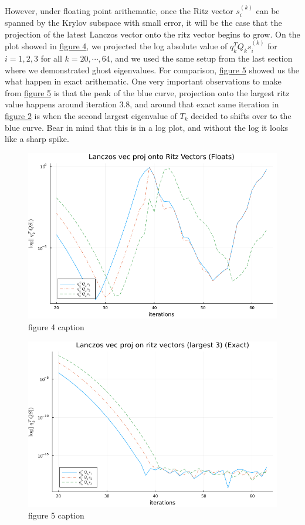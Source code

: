 \documentclass[]{article}
\theoremstyle{definition}
\begin{document}
            However, under floating point arithematic, once the Ritz vector $s_i^{(k)}$ can be spanned by the Krylov subspace with small error, it will be the case that the projection of the latest Lanczos vector onto the ritz vector begins to grow. On the plot showed in \hyperref[fig:4]{figure 4}, we projected the log absolute value of $q_k^TQ_ks_i^{(k)}$ for $i=1, 2, 3$ for all $k=20, \cdots, 64$, and we used the same setup from the last section where we demonstrated ghost eigenvalues. For comparison, \hyperref[fig:5]{figure 5} showed us the what happen in exact arithematic. One very important observations to make from \hyperref[fig:5]{figure 5} is that the peak of the blue curve, projection onto the largest ritz value happens around iteration 3.8, and around that exact same iteration in \hyperref[fig:2]{figure 2} is when the second largest eigenvalue of $T_k$ decided to shifts over to the blue curve. Bear in mind that this is in a log plot, and without the log it looks like a sharp spike. 
            \begin{figure}\label{fig:4}
                \centering
                \includegraphics[width=14cm]{lanczos_proj_on_ritz_float.png}
                \caption{figure 4 caption}
            \end{figure}
            \begin{figure}\label{fig:5}
                \centering
                \includegraphics[width=14cm]{lanczos_proj_on_ritz_exact.png}
                \caption{figure 5 caption}
            \end{figure}
\end{document}
